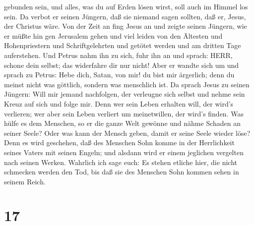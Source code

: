 gebunden sein, und alles, was du auf Erden lösen wirst, soll auch im
Himmel los sein.  Da verbot er seinen Jüngern, daß sie
niemand sagen sollten, daß er, Jesus, der Christus wäre. 
Von der Zeit an fing Jesus an und zeigte seinen Jüngern, wie er müßte
hin gen Jerusalem gehen und viel leiden von den Ältesten und
Hohenpriestern und Schriftgelehrten und getötet werden und am dritten
Tage auferstehen.  Und Petrus nahm ihn zu sich, fuhr ihn an
und sprach: HERR, schone dein selbst; das widerfahre dir nur nicht!
 Aber er wandte sich um und sprach zu Petrus: Hebe dich,
Satan, von mir! du bist mir ärgerlich; denn du meinst nicht was
göttlich, sondern was menschlich ist.  Da sprach Jesus zu
seinen Jüngern: Will mir jemand nachfolgen, der verleugne sich selbst
und nehme sein Kreuz auf sich und folge mir.  Denn wer sein
Leben erhalten will, der wird's verlieren; wer aber sein Leben verliert
um meinetwillen, der wird's finden.  Was hülfe es dem
Menschen, so er die ganze Welt gewönne und nähme Schaden an seiner
Seele? Oder was kann der Mensch geben, damit er seine Seele wieder löse?
 Denn es wird geschehen, daß des Menschen Sohn komme in der
Herrlichkeit seines Vaters mit seinen Engeln; und alsdann wird er einem
jeglichen vergelten nach seinen Werken.  Wahrlich ich sage
euch: Es stehen etliche hier, die nicht schmecken werden den Tod, bis
daß sie des Menschen Sohn kommen sehen in seinem Reich.

\hypertarget{section-16}{%
\section{17}\label{section-16}}

